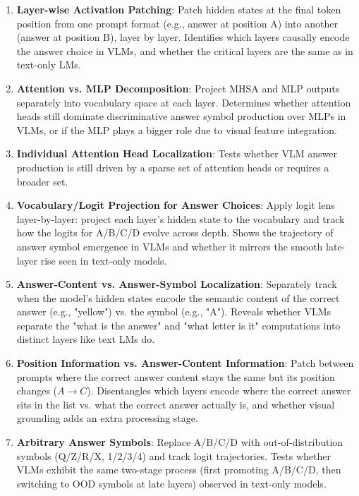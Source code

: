 \documentclass[11pt]{article}
\begin{document}
\begin{enumerate}

\item \textbf{Layer-wise Activation Patching}: Patch hidden states at the final token position from one prompt format (e.g., answer at position A) into another (answer at position B), layer by layer. Identifies which layers causally encode the answer choice in VLMs, and whether the critical layers are the same as in text-only LMs.

\item \textbf{Attention vs. MLP Decomposition}: Project MHSA and MLP outputs separately into vocabulary space at each layer. Determines whether attention heads still dominate discriminative answer symbol production over MLPs in VLMs, or if the MLP plays a bigger role due to visual feature integration.

\item \textbf{Individual Attention Head Localization}: Tests whether VLM answer production is still driven by a sparse set of attention heads or requires a broader set.

\item \textbf{Vocabulary/Logit Projection for Answer Choices}: Apply logit lens layer-by-layer: project each layer's hidden state to the vocabulary and track how the logits for A/B/C/D evolve across depth. Shows the trajectory of answer symbol emergence in VLMs and whether it mirrors the smooth late-layer rise seen in text-only models.

\item \textbf{Answer-Content vs. Answer-Symbol Localization}: Separately track when the model's hidden states encode the semantic content of the correct answer (e.g., "yellow") vs. the symbol (e.g., "A"). Reveals whether VLMs separate the "what is the answer" and "what letter is it" computations into distinct layers like text LMs do.

\item \textbf{Position Information vs. Answer-Content Information}: Patch between prompts where the correct answer content stays the same but its position changes ($A \rightarrow C$). Disentangles which layers encode where the correct answer sits in the list vs. what the correct answer actually is, and whether visual grounding adds an extra processing stage.

\item \textbf{Arbitrary Answer Symbols}: Replace A/B/C/D with out-of-distribution symbols (Q/Z/R/X, 1/2/3/4) and track logit trajectories. Tests whether VLMs exhibit the same two-stage process (first promoting A/B/C/D, then switching to OOD symbols at late layers) observed in text-only models.

\end{enumerate}
\end{document}
